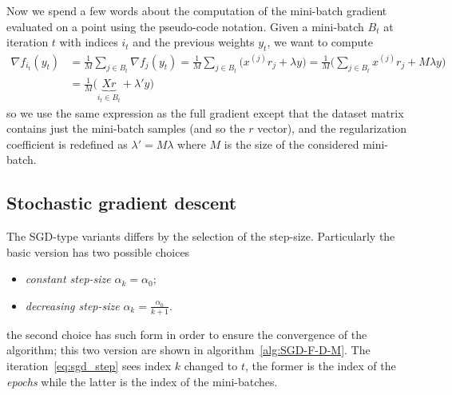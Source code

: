 Now we spend a few words about the computation of the mini-batch gradient evaluated on a point using the pseudo-code notation. Given a mini-batch $B_t$ at iteration $t$ with indices $i_t$ and the previous weights $y_t$, we want to compute
\begin{equation*}
\begin{split}
\nabla f_{i_t}(y_t) &= \frac{1}{M}\sum_{j\in B_t}\nabla f_j(y_t)=\frac{1}{M}\sum_{j\in B_t}\bigl(x^{(j)}r_j+\lambda y\bigr)= \frac{1}{M}\biggl(\sum_{j\in B_t}x^{(j)}r_j+M\lambda y\biggr) \\
 &= \frac{1}{M}\bigl(\underbrace{Xr}_{i_t\in B_t}+\lambda' y\bigr)
\end{split}
\end{equation*}
so we use the same expression as the full gradient except that the dataset matrix contains just the mini-batch samples (and so the $r$ vector), and the regularization coefficient is redefined as $\lambda'=M\lambda$ where $M$ is the size of the considered mini-batch.

\subsection{Stochastic gradient descent}

The SGD-type variants differs by the selection of the step-size. Particularly the basic version has two possible choices
\begin{itemize}
\item \emph{constant step-size} $\alpha_k=\alpha_0$;
\item \emph{decreasing step-size} $\alpha_k=\frac{\alpha_0}{k+1}$.
\end{itemize}
the second choice has such form in order to ensure the convergence of the algorithm; this two version are shown in algorithm~\vref{alg:SGD-F-D-M}. The iteration~\eqref{eq:sgd_step} sees index $k$ changed to $t$, the former is the index of the \emph{epochs} while the latter is the index of the mini-batches.

